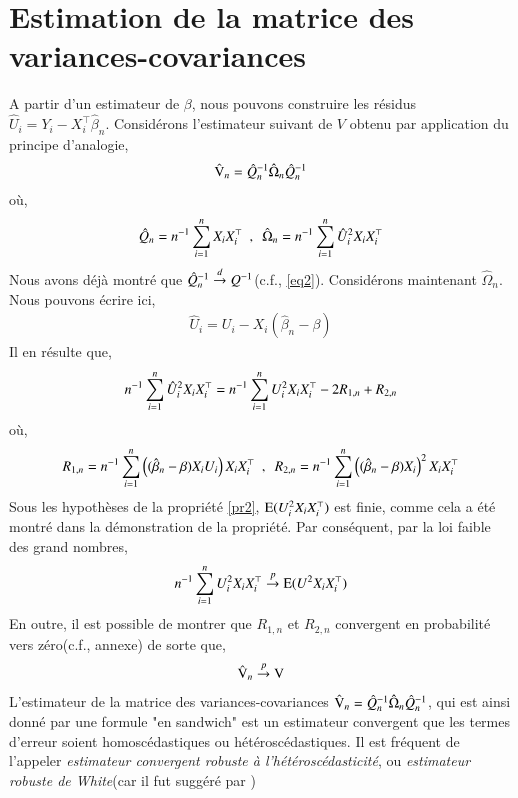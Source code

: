 \documentclass[10pt, reqno]{amsart}
\begin{document}
\section{Estimation de la matrice des variances-covariances}
A partir d'un estimateur de $\beta$, nous pouvons construire les résidus $\hat{U}_i = Y_i - X_i^\top \hat{\beta}_n$.  Considérons l'estimateur suivant de $V$ obtenu par application du principe d'analogie,
\begin{align*}
\hat{\operatorname{V}}_n = \hat{Q}_n^{-1} \hat{\Omega}_n \hat{Q}_n^{-1}
\end{align*}
où,
\begin{align*}
\hat{Q}_n = n^{-1}\sum_{i=1}^n X_iX_i^\top \ \ , \ \ \hat{\Omega}_n = n^{-1}\sum_{i=1}^n \hat{U}_i^2 X_iX_i^\top
\end{align*}
Nous avons déjà montré que $\hat{Q}_n ^{-1} \overset{d}{\rightarrow} Q^{-1}$(c.f., \eqref{eq2}). Considérons maintenant $\hat{\Omega}_n$. Nous pouvons écrire ici,
\begin{align*}
 \hat{U}_i  = U_i - X_i(\hat{\beta}_n- \beta)
\end{align*}
Il en résulte que,
\begin{align}
n^{-1}\sum_{i=1}^n \hat{U}_i^2 X_iX_i^\top = n^{-1} \sum_{i=1}^n U_i^2X_iX_i^\top - 2R_{1,n} + R_{2,n}
\label{eq5}
\end{align}
où,
\begin{align*}
R_{1,n} = n^{-1} \sumobs \left((\hat{\beta}_n- \beta)X_iU_i\right)X_iX_i^\top \ \  , \ \ 
R_{2,n} = n^{-1} \sumobs \left((\hat{\beta}_n- \beta)X_i\right)^2X_iX_i^\top
\end{align*}
Sous les hypothèses de la propriété \ref{pr2}, $\operatorname{E}(U_i^2X_iX_i^\top)$ est finie, comme cela a été montré dans la démonstration de la propriété. Par conséquent, par la loi faible des grand nombres,
\begin{align*}
n^{-1} \sum_{i=1}^n U_i^2 X_iX_i^\top \overset{p}{\rightarrow} \operatorname{E}(U^2X_iX_i^\top)
\end{align*}
En outre, il est possible de montrer que $R_{1,n}$ et $R_{2,n}$ convergent en probabilité vers zéro(c.f., annexe) de sorte que,
\begin{align*}
\hat{\operatorname{V}}_n \overset{p}{\rightarrow} \operatorname{V}
\end{align*}
L'estimateur de la matrice des variances-covariances $\hat{\operatorname{V}}_n = \hat{Q}_n^{-1} \hat{\Omega}_n  \hat{Q}_n^{-1}$, qui est ainsi donné par une formule "en sandwich" est un estimateur convergent que les termes d'erreur soient homoscédastiques ou hétéroscédastiques. Il est fréquent de l'appeler \emph{estimateur convergent robuste à l'hétéroscédasticité}, ou \emph{estimateur robuste de White}(car il fut suggéré par \citep{white1980})
\end{document}
